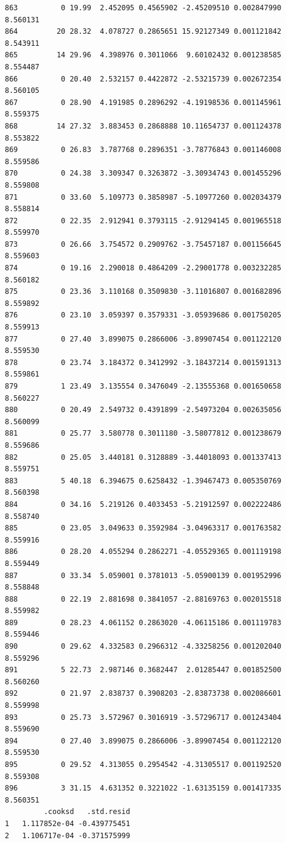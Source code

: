 \documentclass[]{book}
\theoremstyle{definition}
\theoremstyle{definition}
\theoremstyle{definition}
\theoremstyle{remark}
\begin{document}
\begin{verbatim}
863          0 19.99  2.452095 0.4565902 -2.45209510 0.002847990 8.560131
864         20 28.32  4.078727 0.2865651 15.92127349 0.001121842 8.543911
865         14 29.96  4.398976 0.3011066  9.60102432 0.001238585 8.554487
866          0 20.40  2.532157 0.4422872 -2.53215739 0.002672354 8.560105
867          0 28.90  4.191985 0.2896292 -4.19198536 0.001145961 8.559375
868         14 27.32  3.883453 0.2868888 10.11654737 0.001124378 8.553822
869          0 26.83  3.787768 0.2896351 -3.78776843 0.001146008 8.559586
870          0 24.38  3.309347 0.3263872 -3.30934743 0.001455296 8.559808
871          0 33.60  5.109773 0.3858987 -5.10977260 0.002034379 8.558814
872          0 22.35  2.912941 0.3793115 -2.91294145 0.001965518 8.559970
873          0 26.66  3.754572 0.2909762 -3.75457187 0.001156645 8.559603
874          0 19.16  2.290018 0.4864209 -2.29001778 0.003232285 8.560182
875          0 23.36  3.110168 0.3509830 -3.11016807 0.001682896 8.559892
876          0 23.10  3.059397 0.3579331 -3.05939686 0.001750205 8.559913
877          0 27.40  3.899075 0.2866006 -3.89907454 0.001122120 8.559530
878          0 23.74  3.184372 0.3412992 -3.18437214 0.001591313 8.559861
879          1 23.49  3.135554 0.3476049 -2.13555368 0.001650658 8.560227
880          0 20.49  2.549732 0.4391899 -2.54973204 0.002635056 8.560099
881          0 25.77  3.580778 0.3011180 -3.58077812 0.001238679 8.559686
882          0 25.05  3.440181 0.3128889 -3.44018093 0.001337413 8.559751
883          5 40.18  6.394675 0.6258432 -1.39467473 0.005350769 8.560398
884          0 34.16  5.219126 0.4033453 -5.21912597 0.002222486 8.558740
885          0 23.05  3.049633 0.3592984 -3.04963317 0.001763582 8.559916
886          0 28.20  4.055294 0.2862271 -4.05529365 0.001119198 8.559449
887          0 33.34  5.059001 0.3781013 -5.05900139 0.001952996 8.558848
888          0 22.19  2.881698 0.3841057 -2.88169763 0.002015518 8.559982
889          0 28.23  4.061152 0.2863020 -4.06115186 0.001119783 8.559446
890          0 29.62  4.332583 0.2966312 -4.33258256 0.001202040 8.559296
891          5 22.73  2.987146 0.3682447  2.01285447 0.001852500 8.560260
892          0 21.97  2.838737 0.3908203 -2.83873738 0.002086601 8.559998
893          0 25.73  3.572967 0.3016919 -3.57296717 0.001243404 8.559690
894          0 27.40  3.899075 0.2866006 -3.89907454 0.001122120 8.559530
895          0 29.52  4.313055 0.2954542 -4.31305517 0.001192520 8.559308
896          3 31.15  4.631352 0.3221022 -1.63135159 0.001417335 8.560351
         .cooksd   .std.resid
1   1.117852e-04 -0.439775451
2   1.106717e-04 -0.371575999

\end{verbatim}
\end{document}
